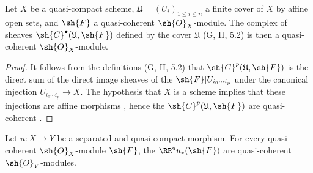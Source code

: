 \begin{lemma}[1.4.9]
\label{III.1.4.9}
Let $X$ be a quasi-compact scheme, $\mathfrak{U}=(U_i)_{1\leq i\leq n}$ a finite cover of $X$ by affine open sets, and ${\sh{F}}$ a quasi-coherent $\sh{O}_X$-module.
The complex of sheaves $\sh{C}^\bullet(\mathfrak{U},\sh{F})$ defined by the cover $\mathfrak{U}$ (G, II, 5.2) is then a quasi-coherent $\sh{O}_X$-module.
\end{lemma}

\begin{proof}
It follows from the definitions (G, II, 5.2) that $\sh{C}^p(\mathfrak{U},\sh{F})$ is the direct sum of the direct image sheaves of the $\sh{F}|U_{i_0\cdots i_p}$ under the canonical injection $U_{i_0\cdots i_p}\to X$.
The hypothesis that $X$ is a scheme implies that these injections are affine morphisms , hence the $\sh{C}^p(\mathfrak{U},\sh{F})$ are quasi-coherent .
\end{proof}

\begin{proposition}[1.4.10]
\label{III.1.4.10}
Let $u:X\to Y$ be a separated and quasi-compact morphism.
For every quasi-coherent $\sh{O}_X$-module $\sh{F}$, the $\RR^q u_*(\sh{F})$ are quasi-coherent $\sh{O}_Y$-modules.
\end{proposition}

